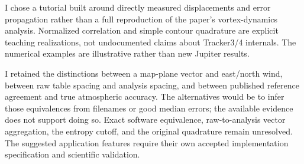 \documentclass[11pt]{article}
\begin{document}
I chose a tutorial built around directly measured displacements and error
propagation rather than a full reproduction of the paper's vortex-dynamics
analysis. Normalized correlation and simple contour quadrature are explicit
teaching realizations, not undocumented claims about Tracker3/4 internals.
The numerical examples are illustrative rather than new Jupiter results.

I retained the distinctions between a map-plane vector and east/north wind,
between raw table spacing and analysis spacing, and between published
reference agreement and true atmospheric accuracy. The alternatives would
be to infer those equivalences from filenames or good median errors; the
available evidence does not support doing so. Exact software equivalence,
raw-to-analysis vector aggregation, the entropy cutoff, and the original
quadrature remain unresolved. The suggested application features require
their own accepted implementation specification and scientific validation.
\end{document}
